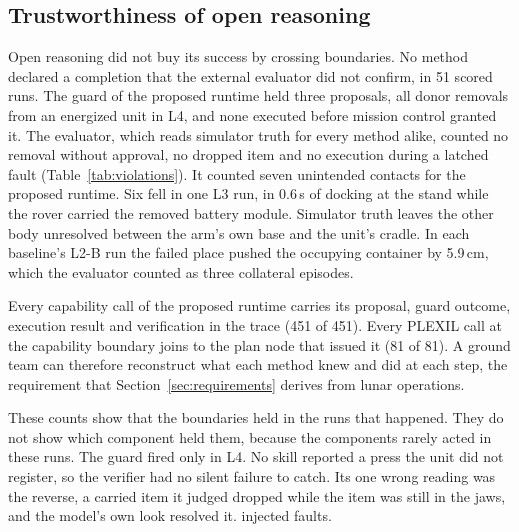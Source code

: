 \subsection{Trustworthiness of open reasoning}
\label{sec:results-trust}

Open reasoning did not buy its success by crossing boundaries. No method declared a completion that the external
evaluator did not confirm, in 51 scored runs. The guard of the proposed runtime held three proposals, all donor
removals from an energized unit in L4, and none executed before mission control granted it. The evaluator, which reads
simulator truth for every method alike, counted no removal without approval, no dropped item and no execution during a
latched fault (Table~\ref{tab:violations}). It counted seven unintended contacts for the proposed runtime. Six fell in
one L3 run, in 0.6\,s of docking at the stand while the rover carried the removed battery module. Simulator truth
leaves the other body unresolved between the arm's own base and the unit's cradle. In each baseline's L2-B run the
failed place pushed the occupying container by 5.9\,cm, which the evaluator counted as three collateral episodes.

Every capability call of the proposed runtime carries its proposal, guard outcome, execution result and verification
in the trace (451 of 451). Every PLEXIL call at the capability boundary joins to the plan node that issued it (81 of
81). A ground team can therefore reconstruct what each method knew and did at each step, the requirement that
Section~\ref{sec:requirements} derives from lunar operations.

These counts show that the boundaries held in the runs that happened. They do not show which component held them,
because the components rarely acted in these runs. The guard fired only in L4. No skill reported a press the unit did not register, so the
verifier had no silent failure to catch. Its one wrong reading was the reverse, a carried item it judged dropped
while the item was still in the jaws, and the model's own look resolved it.
injected faults.

